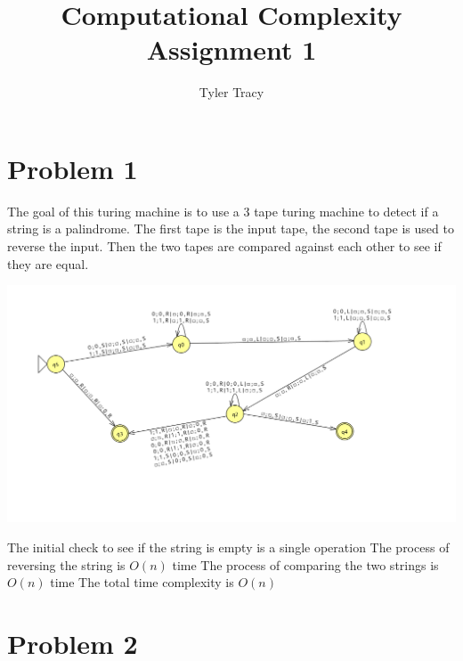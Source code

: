 \documentclass[12pt]{article}
\title{Computational Complexity Assignment 1}
\author{Tyler Tracy}
\begin{document}
\maketitle


\section{Problem 1}


The goal of this turing machine is to use a 3 tape turing machine to detect if a string is a palindrome. The first tape is the input tape, the second tape is used to reverse the input. Then the two tapes are compared against each other to see if they are equal.

\includegraphics[width=\textwidth]{problem1.png}

The initial check to see if the string is empty is a single operation
The process of reversing the string is $O(n)$ time
The process of comparing the two strings is $O(n)$ time
The total time complexity is $O(n)$

\section{Problem 2}
\end{document}
